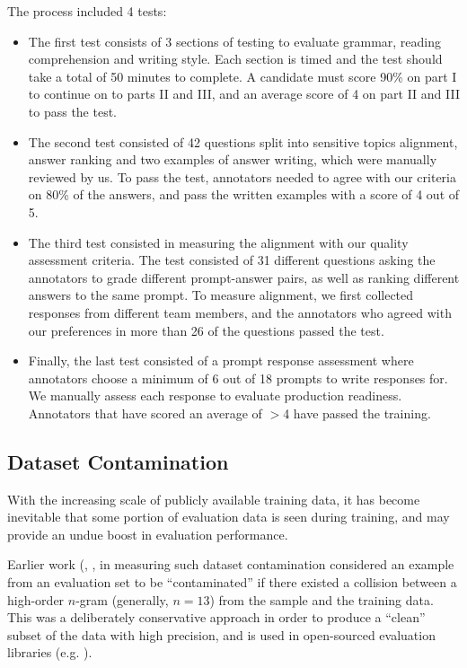\documentclass{article}
\begin{document}
The process included 4 tests:
\begin{itemize}
    \item The first test consists of 3 sections of testing to evaluate grammar, reading comprehension and writing style. Each section is timed and the test should take a total of 50 minutes to complete. A candidate must score 90\% on part I to continue on to parts II and III, and an average score of 4 on part II and III to pass the test.
    \item The second test consisted of 42 questions split into sensitive topics alignment, answer ranking and two examples of answer writing, which were manually reviewed by us. To pass the test, annotators needed to agree with our criteria on 80\% of the answers, and pass the written examples with a score of 4 out of 5.
    \item The third test consisted in measuring the alignment with our quality assessment criteria. The test consisted of 31 different questions asking the annotators to grade different prompt-answer pairs, as well as ranking different answers to the same prompt. To measure alignment, we first collected responses from different team members, and the annotators who agreed with our preferences in more than 26 of the questions passed the test.
    \item Finally, the last test consisted of a prompt response assessment where annotators choose a minimum of 6 out of 18 prompts to write responses for. We manually assess each response to evaluate production readiness. Annotators that have scored an average of $>$4 have passed the training. 
\end{itemize}

\subsection{Dataset Contamination}
\label{sec:dataset_contamination}
With the increasing scale of publicly available training data, it has become inevitable that some portion of evaluation data is seen during training, and may provide an undue boost in evaluation performance.

Earlier work (\cite{gpt3}, \cite{flan}, \cite{glam} in measuring such dataset contamination considered an example from an evaluation set to be ``contaminated'' if there existed a collision between a high-order $n$-gram (generally, $n=13$) from the sample and the training data. This was a deliberately conservative approach in order to produce a ``clean'' subset of the data with high precision, and is used in open-sourced evaluation libraries (e.g. \cite{llm-eval-harness}).
\end{document}
